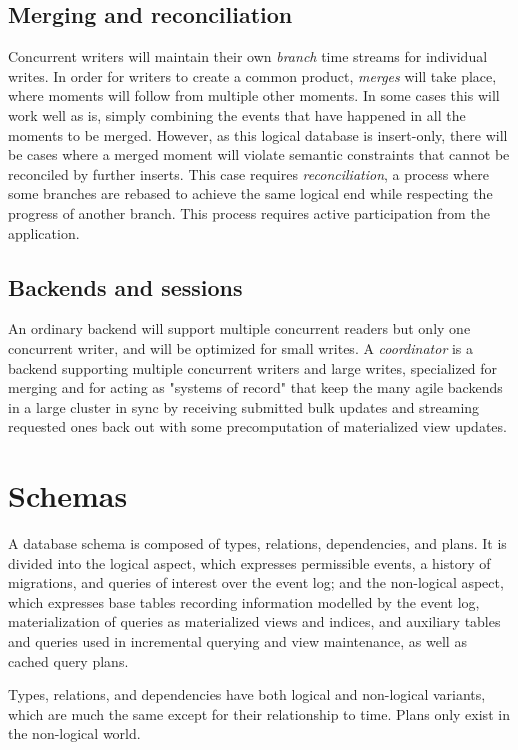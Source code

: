 \documentclass{article}
\begin{document}
\subsection{Merging and reconciliation}

Concurrent writers will maintain their own \emph{branch} time streams for individual writes.  In order for writers to create a common product, \emph{merges} will take place, where moments will follow from multiple other moments.  In some cases this will work well as is, simply combining the events that have happened in all the moments to be merged.  However, as this logical database is insert-only, there will be cases where a merged moment will violate semantic constraints that cannot be reconciled by further inserts.  This case requires \emph{reconciliation}, a process where some branches are rebased to achieve the same logical end while respecting the progress of another branch.  This process requires active participation from the application.

\subsection{Backends and sessions}

An ordinary backend will support multiple concurrent readers but only one concurrent writer, and will be optimized for small writes.  A \emph{coordinator} is a backend supporting multiple concurrent writers and large writes, specialized for merging and for acting as "systems of record" that keep the many agile backends in a large cluster in sync by receiving submitted bulk updates and streaming requested ones back out with some precomputation of materialized view updates.

\section{Schemas}

A database schema is composed of types, relations, dependencies, and plans.  It is divided into the logical aspect, which expresses permissible events, a history of migrations, and queries of interest over the event log; and the non-logical aspect, which expresses base tables recording information modelled by the event log, materialization of queries as materialized views and indices, and auxiliary tables and queries used in incremental querying and view maintenance, as well as cached query plans.

Types, relations, and dependencies have both logical and non-logical variants, which are much the same except for their relationship to time.  Plans only exist in the non-logical world.
\end{document}
